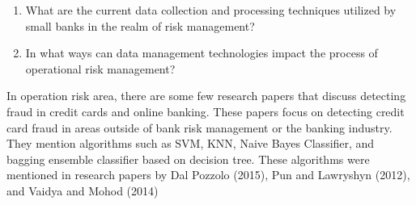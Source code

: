 \begin{enumerate}
    \item What are the current data collection and processing techniques utilized by small banks in the realm of risk
    management?
    \item In what ways can data management technologies impact the process of operational risk management?\\
\end{enumerate}
In operation risk area, there are some few research papers that discuss detecting fraud in credit cards and online banking. These papers focus on detecting credit card fraud in areas outside of bank risk management or the banking industry. 
They mention algorithms such as SVM, KNN, Naive Bayes Classifier, and bagging ensemble classifier based on decision 
tree. These algorithms were mentioned in research papers by Dal Pozzolo (2015), Pun and Lawryshyn (2012), and 
Vaidya and Mohod (2014)
